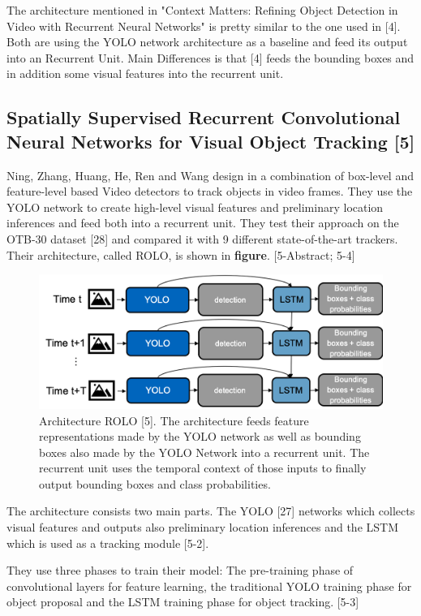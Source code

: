\documentclass[conference]{IEEEtran}
\begin{document}
The architecture mentioned in "Context Matters: Refining Object Detection in Video with Recurrent Neural Networks" is pretty similar to the one used in [4]. Both are using the YOLO network architecture as a baseline and feed its output into an Recurrent Unit. Main Differences is that [4] feeds the bounding boxes and in addition some visual features into the recurrent unit.  

\subsection{Spatially Supervised Recurrent Convolutional Neural Networks for Visual Object Tracking [5]}
Ning, Zhang, Huang, He, Ren and Wang design in \cite{b5} a combination of box-level and feature-level based Video detectors to track objects in video frames. They use the YOLO \cite{27} network to create high-level visual features and preliminary location inferences and feed both into a recurrent unit. They test their approach on the OTB-30 dataset [28] and compared it with 9 different state-of-the-art trackers. Their architecture, called ROLO, is shown in \textbf{figure}. [5-Abstract; 5-4] 

\begin{figure} [h]
\includegraphics[width=\columnwidth]{ROLO}
\caption{Architecture ROLO [5]. The architecture feeds feature representations made by the YOLO network as well as bounding boxes also made by the YOLO Network into a recurrent unit. The recurrent unit uses the temporal context of those inputs to finally output bounding boxes and class probabilities.}
\end{figure}

The architecture consists two main parts. The YOLO [27] networks which collects visual features and outputs also preliminary location inferences and the LSTM which is used as a tracking module [5-2]. \newline 

They use three phases to train their model: The pre-training phase of  convolutional layers for feature learning, the traditional YOLO training phase for object proposal and the LSTM training phase for object tracking. [5-3]  \newline
\end{document}
